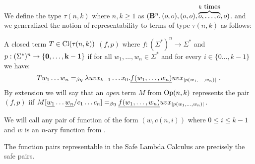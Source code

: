 We define the type $\tau(n,k)$ where $n, k\geq1$ as $(\mathbf{B}^n,(o,o),(o,o),\overbrace{o,\ldots,o}^{k\hbox{ times}},o)$.
and we generalized the notion of representability to terms of type $\tau(n,k)$ as follows:
\begin{definition}
A closed term $T\in{\rm Cl}(\tau(n,k))$ 
$(f,p)$ where $f:(\Sigma^*)^n \rightarrow \Sigma^*$ and $p:(\Sigma^*)^n \rightarrow \{\mathbf{0}, \ldots, \mathbf{k-1}\}$ if for all $w_1,\ldots,w_n\in\Sigma^*$
and for every $i\in \{0\ldots,k-1\}$ we have:
$$
T \zaioncencode{w_1} \ldots \zaioncencode{w_n} =_{\beta\eta} \lambda u v x_{k-1}\ldots x_0 . \zaioncencode{f(w_1,\ldots,w_n)} u v x_{|p(w_1,\ldots,w_n)|} \ .
$$
By extension we will say that an \emph{open} term $M$ from ${\rm Op}(n,k)$
represents the pair $(f,p)$
iif $M[\underline{w_1}\ldots \underline{w_n}/c_1\ldots c_n] =_{\beta\eta} \underline{f(w_1,\ldots,w_n)} u v x_{|p(w_1,\ldots,w_n)|}$.
\end{definition}

We will call  any pair of function of the form
$(w,c(n,i))$ where $0\leq i\leq k-1$ and $w$ is an $n$-ary function
from \safedefset.

\begin{theorem}
\label{thm:zaionc_pair_characterization_safe} The function pairs
representable in the Safe Lambda Calculus are precisely the safe
pairs.
\end{theorem}

